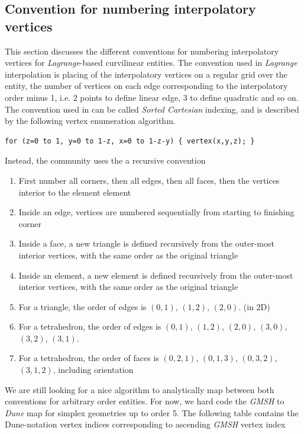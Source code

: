 \subsection{Convention for numbering interpolatory vertices}
\label{impl-gmsh-numbering-convention}

This section discusses the different conventions for numbering interpolatory vertices for \textit{Lagrange}-based curvilinear entities. The convention used in \textit{Lagrange} interpolation is placing of the interpolatory vertices on a regular grid over the entity, the number of vertices on each edge corresponding to the interpolatory order minus 1, i.e. 2 points to define linear edge, 3 to define quadratic and so on. The convention used in \textit{} can be called \textit{Sorted Cartesian} indexing, and is described by the following vertex enumeration algorithm.

\begin{mybox}
\begin{lstlisting}
for (z=0 to 1, y=0 to 1-z, x=0 to 1-z-y) { vertex(x,y,z); }
\end{lstlisting}
\end{mybox}


\noindent
Instead, the \gmsh{} community uses the a recursive convention

\begin{enumerate}
	\item First number all corners, then all edges, then all faces, then the vertices interior to the element element
	\item Inside an edge, vertices are numbered sequentially from starting to finishing corner
	\item Inside a face, a new triangle is defined recursively from the outer-most interior vertices, with the same order as the original triangle
	\item Inside an element, a new element is defined recursively from the outer-most interior vertices, with the same order as the original triangle
	\item For a triangle, the order of edges is $(0,1)$, $(1,2)$, $(2,0)$. (in 2D)
	\item For a tetrahedron, the order of edges is $(0,1)$, $(1,2)$, $(2,0)$, $(3,0)$, $(3,2)$, $(3,1)$.
	\item For a tetrahedron, the order of faces is $(0, 2, 1)$, $(0, 1, 3)$, $(0, 3, 2)$, $(3, 1, 2)$, including orientation
\end{enumerate}

\noindent
We are still looking for a nice algorithm to analytically map between both conventions for arbitrary order entities. For now, we hard code the  \textit{GMSH} to  \textit{Dune} map for simplex geometries up to order 5. The following table contains the Dune-notation vertex indices corresponding to ascending \textit{GMSH} vertex index

